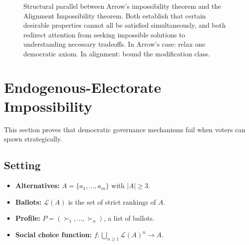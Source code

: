 \documentclass[12pt]{article}
\begin{document}
\begin{figure}[h]
\caption{Structural parallel between Arrow's impossibility theorem and the Alignment Impossibility theorem. Both establish that certain desirable properties cannot all be satisfied simultaneously, and both redirect attention from seeking impossible solutions to understanding necessary tradeoffs. In Arrow's case: relax one democratic axiom. In alignment: bound the modification class.}
\label{fig:arrow-parallel}
\end{figure}


\section{Endogenous-Electorate Impossibility}
\label{sec:electorate-impossibility}

This section proves that democratic governance mechanisms fail when voters can spawn strategically.

\subsection{Setting}

\begin{itemize}
    \item \textbf{Alternatives:} $A = \{a_1, \ldots, a_m\}$ with $|A| \geq 3$.
    \item \textbf{Ballots:} $\mathcal{L}(A)$ is the set of strict rankings of $A$.
    \item \textbf{Profile:} $P = (\succ_1, \ldots, \succ_n)$, a list of ballots.
    \item \textbf{Social choice function:} $f: \bigcup_{n \geq 1} \mathcal{L}(A)^n \to A$.
\end{itemize}
\end{document}
